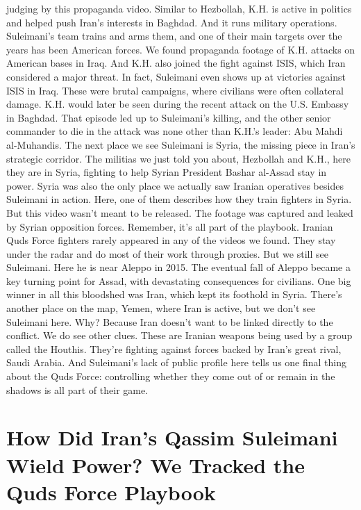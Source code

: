 \begin{itemize}
  judging by this propaganda video. Similar to Hezbollah, K.H. is active
  in politics and helped push Iran's interests in Baghdad. And it runs
  military operations. Suleimani's team trains and arms them, and one of
  their main targets over the years has been American forces. We found
  propaganda footage of K.H. attacks on American bases in Iraq. And K.H.
  also joined the fight against ISIS, which Iran considered a major
  threat. In fact, Suleimani even shows up at victories against ISIS in
  Iraq. These were brutal campaigns, where civilians were often
  collateral damage. K.H. would later be seen during the recent attack
  on the U.S. Embassy in Baghdad. That episode led up to Suleimani's
  killing, and the other senior commander to die in the attack was none
  other than K.H.'s leader: Abu Mahdi al-Muhandis. The next place we see
  Suleimani is Syria, the missing piece in Iran's strategic corridor.
  The militias we just told you about, Hezbollah and K.H., here they are
  in Syria, fighting to help Syrian President Bashar al-Assad stay in
  power. Syria was also the only place we actually saw Iranian
  operatives besides Suleimani in action. Here, one of them describes
  how they train fighters in Syria. But this video wasn't meant to be
  released. The footage was captured and leaked by Syrian opposition
  forces. Remember, it's all part of the playbook. Iranian Quds Force
  fighters rarely appeared in any of the videos we found. They stay
  under the radar and do most of their work through proxies. But we
  still see Suleimani. Here he is near Aleppo in 2015. The eventual fall
  of Aleppo became a key turning point for Assad, with devastating
  consequences for civilians. One big winner in all this bloodshed was
  Iran, which kept its foothold in Syria. There's another place on the
  map, Yemen, where Iran is active, but we don't see Suleimani here.
  Why? Because Iran doesn't want to be linked directly to the conflict.
  We do see other clues. These are Iranian weapons being used by a group
  called the Houthis. They're fighting against forces backed by Iran's
  great rival, Saudi Arabia. And Suleimani's lack of public profile here
  tells us one final thing about the Quds Force: controlling whether
  they come out of or remain in the shadows is all part of their game.
\end{itemize}

\hypertarget{how-did-irans-qassim-suleimani-wield-power-we-tracked-the-quds-force-playbook-1}{%
\section{How Did Iran's Qassim Suleimani Wield Power? We Tracked the
Quds Force
Playbook}\label{how-did-irans-qassim-suleimani-wield-power-we-tracked-the-quds-force-playbook-1}}

